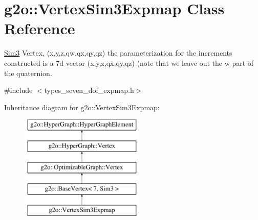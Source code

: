 \hypertarget{classg2o_1_1_vertex_sim3_expmap}{}\section{g2o\+:\+:Vertex\+Sim3\+Expmap Class Reference}
\label{classg2o_1_1_vertex_sim3_expmap}


\mbox{\hyperlink{structg2o_1_1_sim3}{Sim3}} Vertex, (x,y,z,qw,qx,qy,qz) the parameterization for the increments constructed is a 7d vector (x,y,z,qx,qy,qz) (note that we leave out the w part of the quaternion.  




{\ttfamily \#include $<$types\+\_\+seven\+\_\+dof\+\_\+expmap.\+h$>$}

Inheritance diagram for g2o\+:\+:Vertex\+Sim3\+Expmap\+:\begin{figure}[H]
\begin{center}
\leavevmode
\includegraphics[height=5.000000cm]{classg2o_1_1_vertex_sim3_expmap}
\end{center}
\end{figure}
